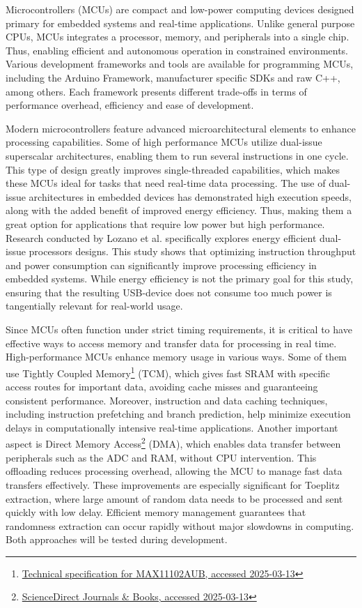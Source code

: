 Microcontrollers (MCUs) are compact and low-power computing devices designed primary for embedded systems and real-time applications. Unlike general purpose CPUs, MCUs integrates a processor, memory, and peripherals into a single chip. Thus, enabling efficient and autonomous operation in constrained environments. Various development frameworks and tools are available for programming MCUs, including the Arduino Framework, manufacturer specific SDKs and raw C++, among others. Each framework presents different trade-offs in terms of performance overhead, efficiency and ease of development.

Modern microcontrollers feature advanced microarchitectural elements to enhance processing capabilities. Some of high performance MCUs utilize dual-issue superscalar architectures, enabling them to run several instructions in one cycle. This type of design greatly improves single-threaded capabilities, which makes these MCUs ideal for tasks that need real-time data processing. The use of dual-issue architectures in embedded devices has demonstrated high execution speeds, along with the added benefit of improved energy efficiency. Thus, making them a great option for applications that require low power but high performance. Research conducted by Lozano et al. \cite{dual-issue} specifically explores energy efficient dual-issue processors designs. This study shows that optimizing instruction throughput and power consumption can significantly improve processing efficiency in embedded systems. While energy efficiency is not the primary goal for this study, ensuring that the resulting USB-device does not consume too much power is tangentially relevant for real-world usage.

Since MCUs often function under strict timing requirements, it is critical to have effective ways to access memory and transfer data for processing in real time. High-performance MCUs enhance memory usage in various ways. Some of them use Tightly Coupled Memory\footnote{\href{https://www.farnell.com/datasheets/1913106.pdf}{Technical specification for MAX11102AUB, accessed 2025-03-13}} (TCM), which gives fast SRAM with specific access routes for important data, avoiding cache misses and guaranteeing consistent performance. Moreover, instruction and data caching techniques, including instruction prefetching and branch prediction, help minimize execution delays in computationally intensive real-time applications. Another important aspect is Direct Memory Access\footnote{\href{https://www.sciencedirect.com/topics/computer-science/direct-memory-access}{ScienceDirect Journals \& Books, accessed 2025-03-13}} (DMA), which enables data transfer between peripherals such as the ADC and RAM, without CPU intervention. This offloading reduces processing overhead, allowing the MCU to manage fast data transfers effectively. These improvements are especially significant for Toeplitz extraction, where large amount of random data needs to be processed and sent quickly with low delay. Efficient memory management guarantees that randomness extraction can occur rapidly without major slowdowns in computing. Both approaches will be tested during development.

